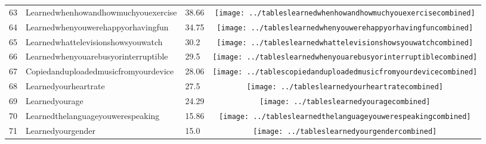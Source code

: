 \documentclass[a4paper,12pt]{article}
\begin{document}
\begin{longtable}{| p{0.5cm} | p{7cm} | p{1cm} | c |}
63 & Learnedwhenhowandhowmuchyouexercise & 38.66 & \texttt{[image: ../tableslearnedwhenhowandhowmuchyouexercisecombined]} \\ 
64 & Learnedwhenyouwerehappyorhavingfun & 34.75 & \texttt{[image: ../tableslearnedwhenyouwerehappyorhavingfuncombined]} \\ 
65 & Learnedwhattelevisionshowsyouwatch & 30.2 & \texttt{[image: ../tableslearnedwhattelevisionshowsyouwatchcombined]} \\ 
66 & Learnedwhenyouarebusyorinterruptible & 29.5 & \texttt{[image: ../tableslearnedwhenyouarebusyorinterruptiblecombined]} \\ 
67 & Copiedanduploadedmusicfromyourdevice & 28.06 & \texttt{[image: ../tablescopiedanduploadedmusicfromyourdevicecombined]} \\ 
68 & Learnedyourheartrate & 27.5 & \texttt{[image: ../tableslearnedyourheartratecombined]} \\ 
69 & Learnedyourage & 24.29 & \texttt{[image: ../tableslearnedyouragecombined]} \\ 
70 & Learnedthelanguageyouwerespeaking & 15.86 & \texttt{[image: ../tableslearnedthelanguageyouwerespeakingcombined]} \\ 
71 & Learnedyourgender & 15.0 & \texttt{[image: ../tableslearnedyourgendercombined]} \\ 
\end{longtable}
\end{document}
